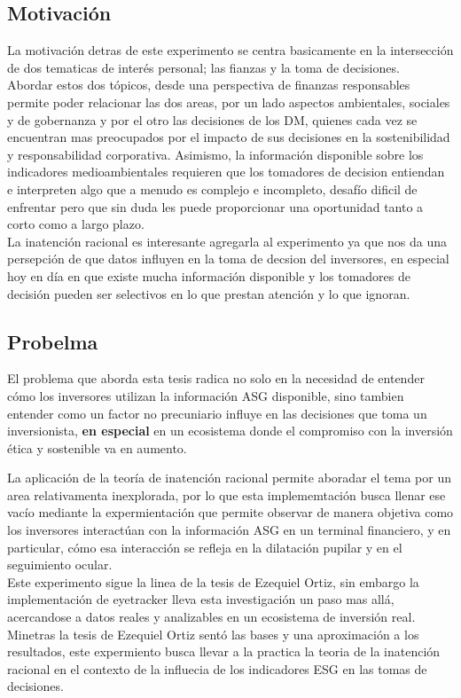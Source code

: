 \documentclass[11pt,letterpaper]{article}
\begin{document}
\subsection{Motivación}
La motivación detras de este experimento se centra basicamente en la intersección de dos tematicas de interés personal; las fianzas y la toma de decisiones.\\
Abordar estos dos tópicos, desde una perspectiva de finanzas responsables permite poder relacionar las dos areas, por un lado aspectos ambientales, sociales y de gobernanza y por el otro las decisiones de los DM, quienes cada vez se encuentran mas preocupados por el impacto de sus decisiones en la sostenibilidad y responsabilidad corporativa.
Asimismo, la información disponible sobre los indicadores medioambientales requieren que los tomadores de decision entiendan e interpreten algo que a menudo es complejo e incompleto, desafío dificil de enfrentar pero que sin duda les puede proporcionar una oportunidad tanto a corto como a largo plazo.\\
La inatención racional es interesante agregarla al experimento ya que nos da una persepción de que datos influyen en la toma de decsion del inversores, en especial hoy en día en que existe mucha información disponible y los tomadores de decisión pueden ser selectivos en lo que prestan atención y lo que ignoran. 

\subsection{Probelma}
El problema que aborda esta tesis radica no solo en la necesidad de entender cómo los inversores utilizan la información ASG disponible, sino tambien entender como un factor no precuniario influye en las decisiones que toma un inversionista, \textbf{en especial} en un ecosistema donde el compromiso con la inversión ética y sostenible va en aumento. 

La aplicación de la teoría de inatención racional permite aboradar el tema por un area relativamenta inexplorada, por lo que esta implememtación busca llenar ese vacío mediante la expermientación que permite observar de manera objetiva como los inversores interactúan con la información ASG en un terminal financiero, y en particular, cómo esa interacción se refleja en la dilatación pupilar y en el seguimiento ocular.\\

Este experimento sigue la linea de la tesis de Ezequiel Ortiz, sin embargo la implementación de eyetracker  lleva esta investigación un paso mas allá, acercandose a datos reales y analizables en un ecosistema de inversión real. Minetras la tesis de Ezequiel Ortiz sentó las bases y una aproximación a los resultados, este expermiento busca llevar a la practica la teoria de la inatención racional en el contexto de la influecia de los indicadores ESG en las tomas de decisiones.
\end{document}
